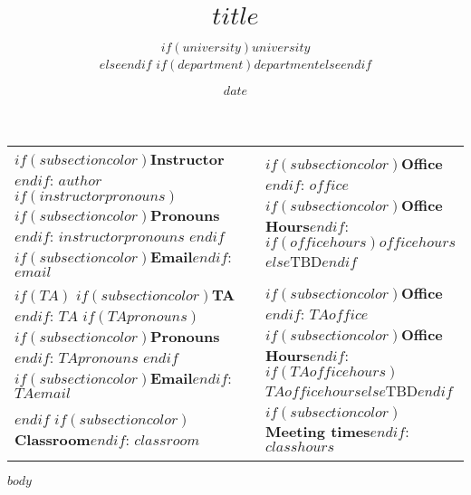 \documentclass[
12pt,
$if(lang)$
    $babel-lang$,
$endif$
$if(papersize)$
    $papersize$paper,
$endif$
$for(classoption)$
    $classoption$$sep$,
$endfor$
]{$documentclass$}
\title{$title$}
\author{$if(university)$$university$ \\$else$$endif$ $if(department)$$department$$else$$endif$}
\date{$date$}
\begin{document}
\maketitle

\begin{tabular*}{.93\textwidth}{p{}p{}}
    \textbf{$if(subsectioncolor)$\textcolor{$subsectioncolor$}{Instructor}$endif$}: $author$
    $if(instructorpronouns)$\newline \textbf{$if(subsectioncolor)$\textcolor{$subsectioncolor$}{Pronouns}$endif$}: $instructorpronouns$
    $endif$\newline \textbf{$if(subsectioncolor)$\textcolor{$subsectioncolor$}{Email}$endif$}: $email$
    & \textbf{$if(subsectioncolor)$\textcolor{$subsectioncolor$}{Office}$endif$}: $office$
    \newline \textbf{$if(subsectioncolor)$\textcolor{$subsectioncolor$}{Office Hours}$endif$}: $if(officehours)$$officehours$$else$TBD$endif$ \\[3em]
    $if(TA)$
    \textbf{$if(subsectioncolor)$\textcolor{$subsectioncolor$}{TA}$endif$}: $TA$
    $if(TApronouns)$\newline \textbf{$if(subsectioncolor)$\textcolor{$subsectioncolor$}{Pronouns}$endif$}: $TApronouns$
    $endif$\newline \textbf{$if(subsectioncolor)$\textcolor{$subsectioncolor$}{Email}$endif$}: $TAemail$
    & \textbf{$if(subsectioncolor)$\textcolor{$subsectioncolor$}{Office}$endif$}: $TAoffice$
    \newline \textbf{$if(subsectioncolor)$\textcolor{$subsectioncolor$}{Office Hours}$endif$}: $if(TAofficehours)$$TAofficehours$$else$TBD$endif$ \\[3em]
    $endif$
    \textbf{$if(subsectioncolor)$\textcolor{$subsectioncolor$}{Classroom}$endif$}: $classroom$
    & \textbf{$if(subsectioncolor)$\textcolor{$subsectioncolor$}{Meeting times}$endif$}: $classhours$ \\
    & \\
    \hline
\end{tabular*}
\vspace{5 mm}

$body$
\end{document}
